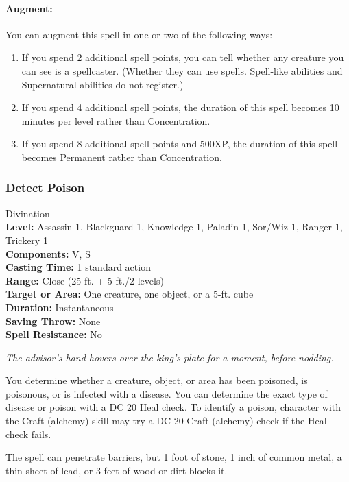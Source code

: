 \paragraph{Augment:} You can augment this spell in one or two of the following ways:
\begin{enumerate}
\item If you spend 2 additional spell points, you can tell whether any creature you can see is a spellcaster. (Whether they can use spells. Spell-like abilities and Supernatural abilities do not register.)
\item If you spend 4 additional spell points, the duration of this spell becomes 10 minutes per level rather than Concentration.
\item If you spend 8 additional spell points and 500XP, the duration of this spell becomes Permanent rather than Concentration.
\end{enumerate}
\subsubsection{Detect Poison}
\label{Spell:DetectPoison}
Divination
\\ \textbf{Level:} Assassin 1, Blackguard 1, Knowledge 1, Paladin 1, Sor/Wiz 1, Ranger 1, Trickery 1
\\ \textbf{Components:} V, S
\\ \textbf{Casting Time:} 1 standard action
\\ \textbf{Range:} Close (25 ft. + 5 ft./2 levels)
\\ \textbf{Target or Area:} One creature, one object, or a 5-ft. cube
\\ \textbf{Duration:} Instantaneous
\\ \textbf{Saving Throw:} None
\\ \textbf{Spell Resistance:} No

\emph{The advisor's hand hovers over the king's plate for a moment, before nodding.}

You determine whether a creature, object, or area has been poisoned, is poisonous, or is infected with a disease.
You can determine the exact type of disease or poison with a DC 20 Heal check.
To identify a poison, character with the Craft (alchemy) skill may try a DC 20 Craft (alchemy) check if the Heal check fails.

The spell can penetrate barriers, but 1 foot of stone, 1 inch of common metal, a thin sheet of lead, or 3 feet of wood or dirt blocks it.
